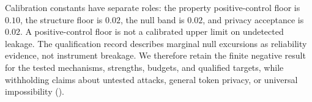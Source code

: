 Calibration constants have separate roles: the property positive-control
floor is $0.10$, the structure floor is $0.02$, the null band is $0.02$,
and privacy acceptance is $0.02$. A positive-control floor is not a
calibrated upper limit on undetected leakage. The qualification record
describes marginal null excursions as reliability evidence, not instrument
breakage. We therefore retain the finite negative result for the tested
mechanisms, strengths, budgets, and qualified targets, while withholding
claims about untested attacks, general token privacy, or universal
impossibility ().
